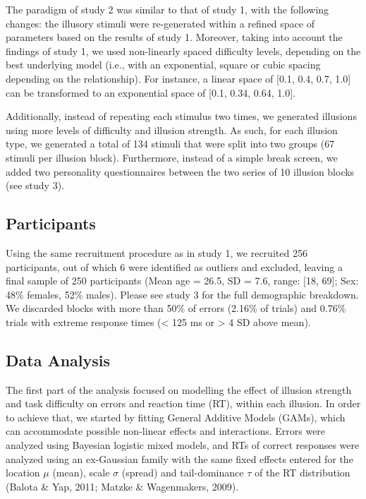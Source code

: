 \documentclass[
  man,floatsintext]{apa6}
\begin{document}
The paradigm of study 2 was similar to that of study 1, with the following changes: the illusory stimuli were re-generated within a refined space of parameters based on the results of study 1. Moreover, taking into account the findings of study 1, we used non-linearly spaced difficulty levels, depending on the best underlying model (i.e., with an exponential, square or cubic spacing depending on the relationship). For instance, a linear space of {[}0.1, 0.4, 0.7, 1.0{]} can be transformed to an exponential space of {[}0.1, 0.34, 0.64, 1.0{]}.

Additionally, instead of repeating each stimulus two times, we generated illusions using more levels of difficulty and illusion strength. As such, for each illusion type, we generated a total of 134 stimuli that were split into two groups (67 stimuli per illusion block). Furthermore, instead of a simple break screen, we added two personality questionnaires between the two series of 10 illusion blocks (see study 3).

\hypertarget{participants-1}{%
\subsection{Participants}\label{participants-1}}

Using the same recruitment procedure as in study 1, we recruited 256 participants, out of which 6 were identified as outliers and excluded, leaving a final sample of 250 participants (Mean age = 26.5, SD = 7.6, range: {[}18, 69{]}; Sex: 48\% females, 52\% males). Please see study 3 for the full demographic breakdown. We discarded blocks with more than 50\% of errors (2.16\% of trials) and 0.76\% trials with extreme response times (\textless{} 125 ms or \textgreater{} 4 SD above mean).

\hypertarget{data-analysis-1}{%
\subsection{Data Analysis}\label{data-analysis-1}}

The first part of the analysis focused on modelling the effect of illusion strength and task difficulty on errors and reaction time (RT), within each illusion. In order to achieve that, we started by fitting General Additive Models (GAMs), which can accommodate possible non-linear effects and interactions. Errors were analyzed using Bayesian logistic mixed models, and RTs of correct responses were analyzed using an ex-Gaussian family with the same fixed effects entered for the location \(\mu\) (mean), scale \(\sigma\) (spread) and tail-dominance \(\tau\) of the RT distribution (Balota \& Yap, 2011; Matzke \& Wagenmakers, 2009).
\end{document}

